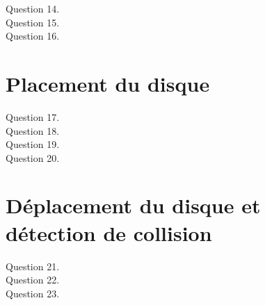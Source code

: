 \documentclass[11pt]{scrartcl}
\begin{document}
\begin{description}
\item[Question 14.]
\item[Question 15.]
\item[Question 16.]
\end{description}

\section{Placement du disque}

\begin{description}
\item[Question 17.]
\item[Question 18.]
\item[Question 19.]
\item[Question 20.]
\end{description}

\section{Déplacement du disque et détection de collision}

\begin{description}
\item[Question 21.]
\item[Question 22.]
\item[Question 23.]
\end{description}
\end{document}
